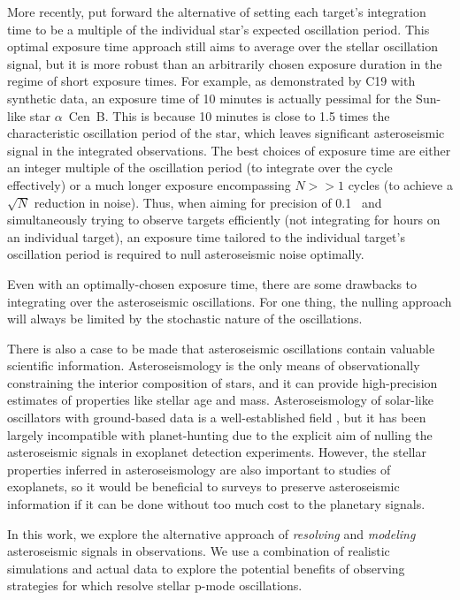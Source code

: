 \documentclass[modern]{aastex62}
\begin{document}
More recently, \citet[][hereafter C19]{Chaplin2019} put forward the alternative of setting each target's integration time to be a multiple of the individual star's expected oscillation period. 
This optimal exposure time approach still aims to average over the stellar oscillation signal, but it is more robust than an arbitrarily chosen exposure duration in the regime of short exposure times. 
For example, as demonstrated by C19 with synthetic data, an exposure time of 10 minutes is actually pessimal for the Sun-like star $\alpha$~Cen~B. 
This is because 10 minutes is close to 1.5 times the characteristic oscillation period of the star, which leaves significant asteroseismic signal in the integrated \RV observations. 
The best choices of exposure time are either an integer multiple of the oscillation period (to integrate over the cycle effectively) or a much longer exposure encompassing $N>>1$ cycles (to achieve a $\sqrt{N}$ reduction in noise). 
Thus, when aiming for \RV precision of 0.1 \ms\ and simultaneously trying to observe targets efficiently (\ie not integrating for hours on an individual target), an exposure time tailored to the individual target's oscillation period is required to null asteroseismic noise optimally.

Even with an optimally-chosen exposure time, there are some drawbacks to integrating over the asteroseismic oscillations. 
For one thing, the nulling approach will always be limited by the stochastic nature of the oscillations. 

There is also a case to be made that asteroseismic oscillations contain valuable scientific information. 
Asteroseismology is the only means of observationally constraining the interior composition of stars, and it can provide high-precision estimates of properties like stellar age and mass. 
Asteroseismology of solar-like oscillators with ground-based \RV data is a well-established field \citep[see e.g.][for a review]{Bedding2003}, but it has been largely incompatible with \RV planet-hunting due to the explicit aim of nulling the asteroseismic signals in exoplanet detection experiments. 
However, the stellar properties inferred in asteroseismology are also important to studies of exoplanets, so it would be beneficial to \EPRV surveys to preserve asteroseismic information if it can be done without too much cost to the planetary signals.

In this work, we explore the alternative approach of \textit{resolving} and \textit{modeling} asteroseismic signals in \EPRV observations. 
We use a combination of realistic simulations and actual \EXPRES data to explore the potential benefits of observing strategies for \EPRV which resolve stellar p-mode oscillations. 
\end{document}
